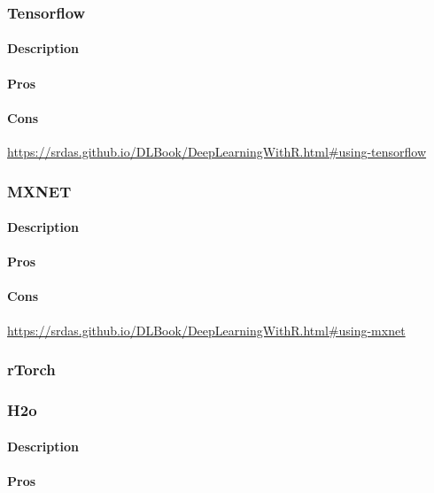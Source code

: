 \documentclass[6pt,letter]{article}\usepackage[]{graphicx}\usepackage[]{color}
\begin{document}
\subsubsection{Tensorflow}
\paragraph{Description}
\paragraph{Pros}
\paragraph{Cons}

\url{https://srdas.github.io/DLBook/DeepLearningWithR.html#using-tensorflow}

\subsubsection{MXNET}
\paragraph{Description}
\paragraph{Pros}
\paragraph{Cons}
\url{https://srdas.github.io/DLBook/DeepLearningWithR.html#using-mxnet}

\subsubsection{rTorch}

\subsubsection{H2o} 
\paragraph{Description}
\paragraph{Pros}
\end{document}
